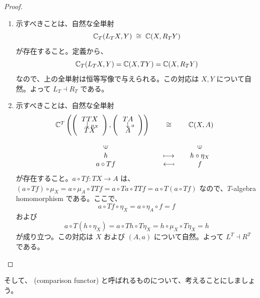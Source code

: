 \documentclass[
		head_space=20mm,
		foot_space=20mm,
		gutter=10mm,
		line_length=190mm
]{jlreq}
\begin{document}
\begin{proof}
	\begin{enumerate}
		\item 示すべきことは、自然な全単射 \[\mathbb{C}_T(L_TX,Y)\;\cong\;\mathbb{C}(X,R_TY)\] が存在すること。定義から、\[\mathbb{C}_T(L_TX,Y)=\mathbb{C}(X,TY)=\mathbb{C}(X,R_TY)\] なので、上の全単射は恒等写像で与えられる。この対応は $X,Y$ について自然。よって $L_T\dashv R_T$ である。\vspace{5pt} 
		\item 示すべきことは、自然な全単射 \[\begin{array}{ccc}\C^T\left(\left(\begin{array}{c}TTX\\[-4pt]~~\downarrow\;\scriptstyle\mu_X\\[-4pt]TX\end{array}\right),\left(\begin{array}{c}TA\\[-4pt]~~\downarrow\;\scriptstyle a\\[-4pt]A\end{array}\right)\right)~~~ &\cong& ~~~\C(X,A)~~~ \\[20pt] \rotatebox{90}{$\in$}&&\rotatebox{90}{$\in$}\\ h&\longmapsto&h\circ\eta_X\\a\circ Tf&\reflectbox{$\longmapsto$}&f\end{array}\] が存在すること。$a\circ Tf\colon TX\to A$ は、$(a\circ Tf)\circ\mu_X=a\circ\mu_A\circ TTf=a\circ Ta\circ TTf=a\circ T(a\circ Tf)$ なので、$T$-algebra homomorphism である。ここで、\[a\circ Tf\circ \eta_X=a\circ\eta_A\circ f=f\] および \[a\circ T(h\circ\eta_X)=a\circ Th\circ T\eta_X=h\circ\mu_X\circ T\eta_X=h\] が成り立つ。この対応は $X$ および $(A,a)$ について自然。よって $L^T\dashv R^T$ である。
	\end{enumerate}
\end{proof}

\clearpage

\noindent そして、 (comparison functor) と呼ばれるものについて、考えることにしましょう。
\end{document}
